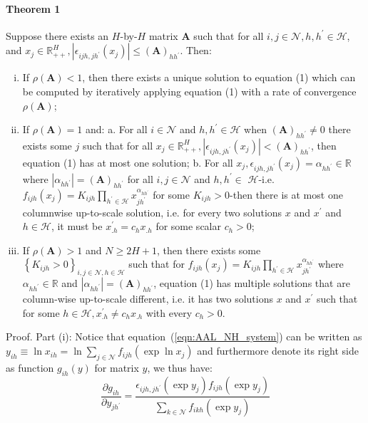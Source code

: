 \paragraph{Theorem 1}
Suppose there exists an $H$-by-$H$ matrix $\mathbf{A}$ 
such that for all $i, j \in \mathcal{N}, h, h^{\prime} \in \mathcal{H}$, 
and $x_j \in \mathbb{R}_{++}^H,\left|\epsilon_{i j h, j h^{\prime}}\left(x_j\right)\right| \leq(\mathbf{A})_{h h^{\prime}}$. 
Then:
\begin{enumerate}[(i)]
    \item If $\rho(\mathbf{A})<1$, then there exists a unique solution to equation (1) which can be computed by iteratively applying equation (1) with a rate of convergence $\rho \mathbf{( A )}$;
    \item If $\rho(\mathbf{A})=1$ and:
    a. For all $i \in \mathcal{N}$ and $h, h^{\prime} \in \mathcal{H}$ when $(\mathbf{A})_{h h^{\prime}} \neq 0$ there exists some $j$ such that for all $x_j \in \mathbb{R}_{++}^H,\left|\epsilon_{i j h, j h^{\prime}}\left(x_j\right)\right|<(\mathbf{A})_{h h^{\prime}}$, then equation (1) has at most one solution;
    b. For all $x_j, \epsilon_{i j h, j h^{\prime}}\left(x_j\right)=\alpha_{h h^{\prime}} \in \mathbb{R}$ where $\left|\alpha_{h h^{\prime}}\right|=(\mathbf{A})_{h h^{\prime}}$ for all $i, j \in \mathcal{N}$ and $h, h^{\prime} \in$ $\mathcal{H}$-i.e. $f_{i j h}\left(x_j\right)=K_{i j h} \prod_{h^{\prime} \in \mathcal{H}} x_{j h^{\prime}}^{\alpha_{h h^{\prime}}}$ for some $K_{i j h}>0$-then there is at most one columnwise up-to-scale solution, i.e. for every two solutions $x$ and $x^{\prime}$ and $h \in \mathcal{H}$, it must be $x_{. h}^{\prime}=c_h x_{. h}$ for some scalar $c_h>0$;
    \item If $\rho(\mathbf{A})>1$ and $N \geq 2 H+1$, then there exists some $\left\{K_{i j h}>0\right\}_{i, j \in \mathcal{N}, h \in \mathcal{H}}$ such that for $f_{i j h}\left(x_j\right)=K_{i j h} \prod_{h^{\prime} \in \mathcal{H}} x_{j h^{\prime}}^{\alpha_{h h^{\prime}}}$ where $\alpha_{h h^{\prime}} \in \mathbb{R}$ and $\left|\alpha_{h h^{\prime}}\right|=(\mathbf{A})_{h h^{\prime}}$, equation (1) has multiple solutions that are column-wise up-to-scale different, i.e. it has two solutions $x$ and $x^{\prime}$ such that for some $h \in \mathcal{H}, x_{. h}^{\prime} \neq c_h x_{. h}$ with every $c_h>0$.
    
\end{enumerate}

Proof. Part (i): Notice that equation~(\ref{eqn:AAL_NH_system}) 
can be written as 
$y_{i h} \equiv \ln x_{i h}=\ln \sum_{j \in \mathcal{N}} f_{i j h}\left(\exp \ln x_j\right)$ 
and furthermore denote its right side as function $g_{i h}(y)$ for matrix $y$, we thus have:
\begin{equation}
    \label{eqn:proof_part_i1}
    \frac{\partial g_{i h}}{\partial y_{j h^{\prime}}}=\frac{\epsilon_{i j h, j h^{\prime}}\left(\exp y_j\right) f_{i j h}\left(\exp y_j\right)}{\sum_{k \in \mathcal{N}} f_{i k h}\left(\exp y_j\right)}
\end{equation}




